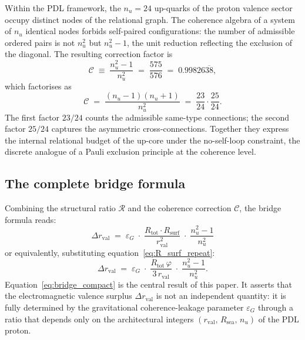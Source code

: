 \documentclass[11pt,a4paper]{article}
\begin{document}
Within the PDL framework, the $n_u = 24$ up-quarks of the proton valence sector occupy distinct nodes of the relational graph. The coherence algebra of a system of $n_u$ identical nodes forbids self-paired configurations: the number of admissible ordered pairs is not $n_u^2$ but $n_u^2 - 1$, the unit reduction reflecting the exclusion of the diagonal. The resulting correction factor is
\begin{equation}
    \mathcal{C} 
    \;\equiv\; \frac{n_u^2 - 1}{n_u^2}
    \;=\; \frac{575}{576}
    \;=\; 0.99826\overline{38},
    \label{eq:C_def}
\end{equation}
which factorises as
\begin{equation}
    \mathcal{C} 
    \;=\; \frac{(n_u-1)(n_u+1)}{n_u^2}
    \;=\; \frac{23}{24}\cdot\frac{25}{24}.
    \label{eq:C_factored}
\end{equation}
The first factor $23/24$ counts the admissible same-type connections; the second factor $25/24$ captures the asymmetric cross-connections. Together they express the internal relational budget of the up-core under the no-self-loop constraint, the discrete analogue of a Pauli exclusion principle at the coherence level.

\subsection{The complete bridge formula}

Combining the structural ratio $\mathcal{R}$ and the coherence correction $\mathcal{C}$, the bridge formula reads:
\begin{equation}
    \boxed{
    \Delta r_{\mathrm{val}} 
    \;=\; \varepsilon_G\;\cdot\;
    \frac{R_{\mathrm{tot}}\cdot R_{\mathrm{surf}}}{r_{\mathrm{val}}^2}
    \;\cdot\;
    \frac{n_u^2 - 1}{n_u^2}
    }
    \label{eq:bridge_compact}
\end{equation}
or equivalently, substituting equation~\eqref{eq:R_surf_repeat}:
\begin{equation}
    \Delta r_{\mathrm{val}} 
    \;=\; \varepsilon_G\;\cdot\;
    \frac{R_{\mathrm{tot}}\,\varphi}{3\,r_{\mathrm{val}}}
    \;\cdot\;
    \frac{n_u^2 - 1}{n_u^2}.
    \label{eq:bridge_explicit}
\end{equation}
Equation~\eqref{eq:bridge_compact} is the central result of this paper. It asserts that the electromagnetic valence surplus $\Delta r_{\mathrm{val}}$ is not an independent 
quantity: it is fully determined by the gravitational coherence-leakage parameter $\varepsilon_G$ through a ratio that depends only on the architectural integers $(r_{\mathrm{val}},\,R_{\mathrm{sea}},\,n_u)$ of the PDL proton.
\end{document}
